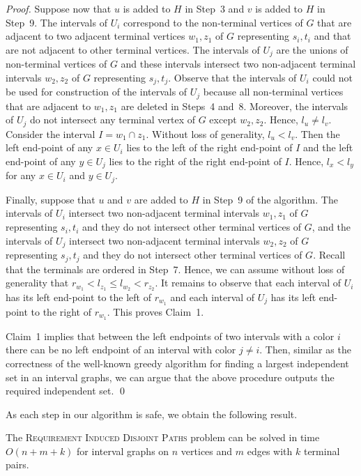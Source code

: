 \documentclass{llncs}
\newcommand{\problemRIDP}{\textsc{Requirement Induced Disjoint Paths}}
\begin{document}
\begin{proof}
Suppose now that $u$ is added to $H$ in Step~3 and $v$ is added to $H$ in Step~9. The intervals of $U_i$ correspond to the non-terminal vertices of $G$ that are adjacent to two adjacent terminal vertices $w_1,z_1$ of $G$ representing $s_i,t_i$ and that are not adjacent to other terminal vertices.  The intervals of $U_j$ are the unions of non-terminal vertices of $G$ and these intervals intersect two non-adjacent terminal intervals $w_2,z_2$ of $G$ representing $s_j,t_j$. Observe that the intervals of $U_i$ could not be used for construction of the intervals of $U_j$ because all non-terminal vertices that are adjacent to $w_1,z_1$ are deleted in Steps~4 and~8. 
Moreover, the intervals of $U_j$ do not intersect any terminal vertex of $G$ except $w_2,z_2$.
Hence, $l_u\neq l_v$. Consider the interval $I=w_1\cap z_1$.
Without loss of generality, $l_u< l_v$. Then the left end-point of  any $x\in U_i$ lies to the left of the right end-point of $I$ and the left end-point of  any $y\in U_j$ lies to the right of the right end-point of $I$. Hence, $l_x<l_y$ for any $x\in U_i$ and $y\in U_j$.

Finally, suppose that $u$ and $v$ are added to $H$ in Step~9 of the algorithm. The intervals of $U_i$ intersect two non-adjacent terminal intervals $w_1,z_1$ of $G$ representing $s_i,t_i$ and they do not intersect other terminal vertices of $G$, and the intervals of $U_j$ intersect two non-adjacent terminal intervals $w_2,z_2$ of $G$ representing $s_j,t_j$ and they do not intersect other terminal vertices of $G$. Recall that the terminals are ordered in Step~7. Hence, we can assume without loss of generality that $r_{w_1}<l_{z_1}\leq l_{w_2}<r_{z_2}$. It remains to observe that each interval of $U_i$ has its left end-point to the left of $r_{w_1}$ and each interval of $U_j$ has its left end-point to the right of $r_{w_1}$. This proves Claim~1.

\medskip
Claim~1 implies that between the left endpoints of two intervals with a color $i$ there can be no left endpoint of an interval with color $j \not=i$. Then, similar as the correctness of the well-known greedy algorithm for finding a largest independent set in an interval graphs, we can argue that the above procedure outputs the required independent set.
\qed
\end{proof}

As each step in our algorithm is safe, we obtain the following result.

\begin{theorem}\label{t-interval}
The \problemRIDP{} problem can be solved in time 
$O(n+m+k)$ for interval graphs on $n$ vertices and $m$ edges with $k$ terminal pairs.
\end{theorem} 
\end{document}
